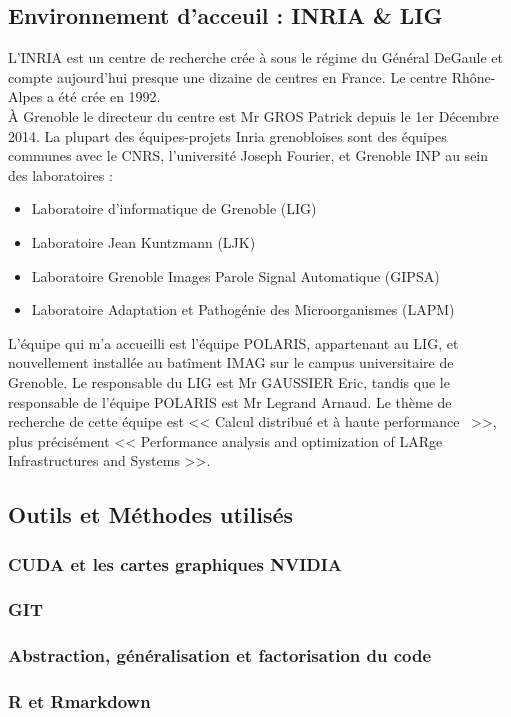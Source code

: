 \documentclass[a4paper,12pt]{article}
\begin{document}
{	\subsection{Environnement d'acceuil : INRIA \& LIG}
	\indent L’INRIA est un centre de recherche cr\'e{}e \`a sous le r\'e{}gime du Général DeGaule et compte aujourd’hui presque une dizaine de centres en France. Le centre Rhône-Alpes a été crée en 1992.\\
	\indent \`A Grenoble le directeur du centre est Mr GROS Patrick depuis le 1er Décembre 2014. La plupart des \'e{}quipes-projets Inria grenobloises sont des
\'e{}quipes communes avec le CNRS, l’université Joseph Fourier, et Grenoble INP au sein des laboratoires :
\begin{itemize}
\item Laboratoire d’informatique de Grenoble (LIG)
\item Laboratoire Jean Kuntzmann (LJK)
\item Laboratoire Grenoble Images Parole Signal Automatique (GIPSA)
\item Laboratoire Adaptation et Pathogénie des Microorganismes (LAPM)
\end{itemize}
	\indent \indent L'\'e{}quipe qui m'a accueilli est l'\'e{}quipe POLARIS, appartenant au LIG, et nouvellement install\'e{}e au bat\^iment IMAG sur le campus universitaire de Grenoble. Le responsable du LIG est Mr GAUSSIER Eric, tandis que le responsable de l'\'e{}quipe POLARIS est Mr Legrand Arnaud. Le thème de recherche de cette \'e{}quipe est << Calcul distribu\'e et \`a haute performance~ >>, plus pr\'e{}cis\'e{}ment << Performance analysis and optimization of LARge Infrastructures and Systems >>.
	\subsection{Outils et Méthodes utilis\'e{}s}
	\subsubsection{CUDA et les cartes graphiques NVIDIA}
	\subsubsection{GIT}
	\subsubsection{Abstraction, g\'e{}n\'e{}ralisation et factorisation du code}
	\subsubsection{R et Rmarkdown}
}
\end{document}
